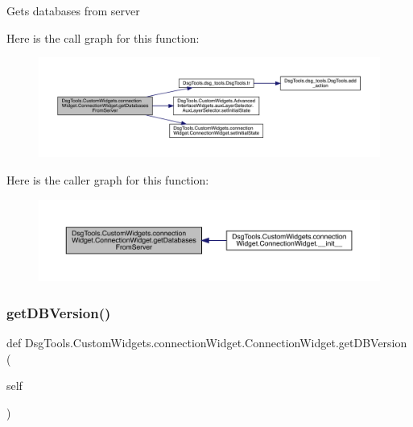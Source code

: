 \begin{DoxyVerb}Gets databases from server
\end{DoxyVerb}
 Here is the call graph for this function\+:
\nopagebreak
\begin{figure}[H]
\begin{center}
\leavevmode
\includegraphics[width=350pt]{class_dsg_tools_1_1_custom_widgets_1_1connection_widget_1_1_connection_widget_ae789614935c50c34eb9d3df90859938e_cgraph}
\end{center}
\end{figure}
Here is the caller graph for this function\+:
\nopagebreak
\begin{figure}[H]
\begin{center}
\leavevmode
\includegraphics[width=350pt]{class_dsg_tools_1_1_custom_widgets_1_1connection_widget_1_1_connection_widget_ae789614935c50c34eb9d3df90859938e_icgraph}
\end{center}
\end{figure}
\mbox{\label{class_dsg_tools_1_1_custom_widgets_1_1connection_widget_1_1_connection_widget_a868be5c3d72e9f02fd128876ae6f4468}} 
\subsubsection{\texorpdfstring{get\+D\+B\+Version()}{getDBVersion()}}
{\footnotesize\ttfamily def Dsg\+Tools.\+Custom\+Widgets.\+connection\+Widget.\+Connection\+Widget.\+get\+D\+B\+Version (\begin{DoxyParamCaption}\item[{}]{self }\end{DoxyParamCaption})}

